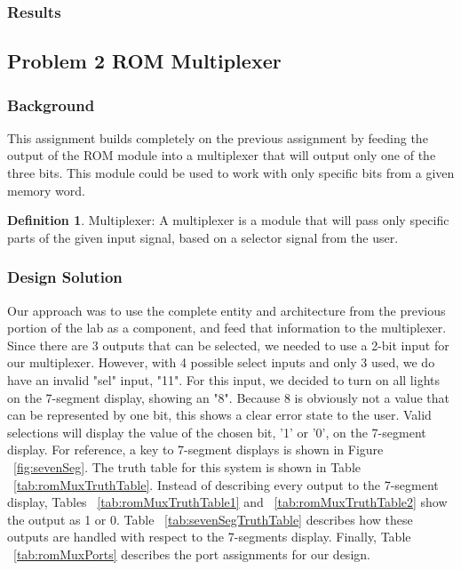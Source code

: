 \documentclass[11pt]{article}
\begin{document}
\subsubsection{Results}

\subsection{Problem 2 ROM Multiplexer}

\subsubsection{Background}
This assignment builds completely on the previous assignment by feeding the output of the ROM module into a multiplexer that will output only one of the three bits. This module could be used to work with only specific bits from a given memory word.

\theoremstyle{definition}
\newtheorem{definition}{Definition}
\begin{definition}
Multiplexer: A multiplexer is a module that will pass only specific parts of the given input signal, based on a selector signal from the user.
\end{definition}

\subsubsection{Design Solution}
Our approach was to use the complete entity and architecture from the previous portion of the lab as a component, and feed that information to the multiplexer. Since there are 3 outputs that can be selected, we needed to use a 2-bit input for our multiplexer. However, with 4 possible select inputs and only 3 used, we do have an invalid "sel" input, "11". For this input, we decided to turn on all lights on the 7-segment display, showing an "8". Because 8 is obviously not a value that can be represented by one bit, this shows a clear error state to the user. Valid selections will display the value of the chosen bit, '1' or '0', on the 7-segment display. For reference, a key to 7-segment displays is shown in Figure ~\ref{fig:sevenSeg}. The truth table for this system is shown in Table ~\ref{tab:romMuxTruthTable}. Instead of describing every output to the 7-segment display, Tables ~\ref{tab:romMuxTruthTable1} and ~\ref{tab:romMuxTruthTable2} show the output as 1 or 0. Table ~\ref{tab:sevenSegTruthTable} describes how these outputs are handled with respect to the 7-segments display. Finally, Table ~\ref{tab:romMuxPorts} describes the port assignments for our design.
\end{document}

